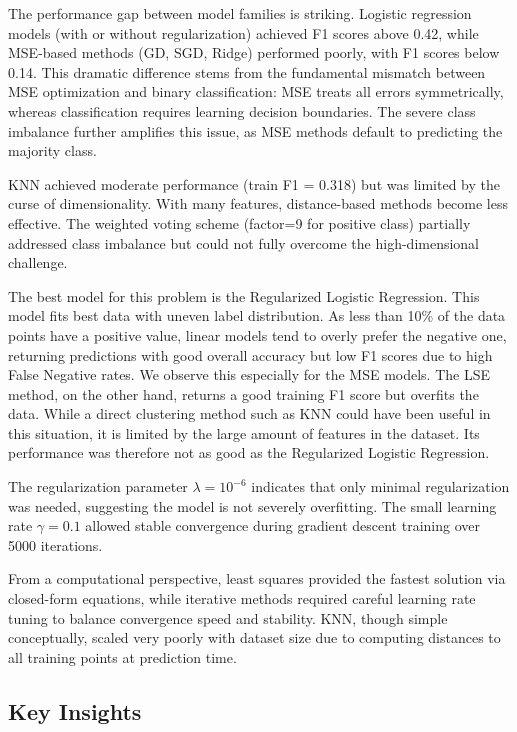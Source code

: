 \documentclass[10pt,conference,compsocconf]{IEEEtran}
\begin{document}
The performance gap between model families is striking. Logistic regression models (with or without regularization) achieved F1 scores above 0.42, while MSE-based methods (GD, SGD, Ridge) performed poorly, with F1 scores below 0.14. This dramatic difference stems from the fundamental mismatch between MSE optimization and binary classification: MSE treats all errors symmetrically, whereas classification requires learning decision boundaries. The severe class imbalance further amplifies this issue, as MSE methods default to predicting the majority class.

KNN achieved moderate performance (train F1 = 0.318) but was limited by the curse of dimensionality. With many features, distance-based methods become less effective. The weighted voting scheme (factor=9 for positive class) partially addressed class imbalance but could not fully overcome the high-dimensional challenge.

The best model for this problem is the Regularized Logistic Regression. This model fits best data with uneven label distribution. As less than 10\% of the data points have a positive value, linear models tend to overly prefer the negative one, returning predictions with good overall accuracy but low F1 scores due to high False Negative rates. We observe this especially for the MSE models. The LSE method, on the other hand, returns a good training F1 score but overfits the data. While a direct clustering method such as KNN could have been useful in this situation, it is limited by the large amount of features in the dataset. Its performance was therefore not as good as the Regularized Logistic Regression.

The regularization parameter $\lambda=10^{-6}$ indicates that only minimal regularization was needed, suggesting the model is not severely overfitting. The small learning rate $\gamma=0.1$ allowed stable convergence during gradient descent training over 5000 iterations.

From a computational perspective, least squares provided the fastest solution via closed-form equations, while iterative methods required careful learning rate tuning to balance convergence speed and stability. KNN, though simple conceptually, scaled very poorly with dataset size due to computing distances to all training points at prediction time.

\subsection{Key Insights}
\end{document}
